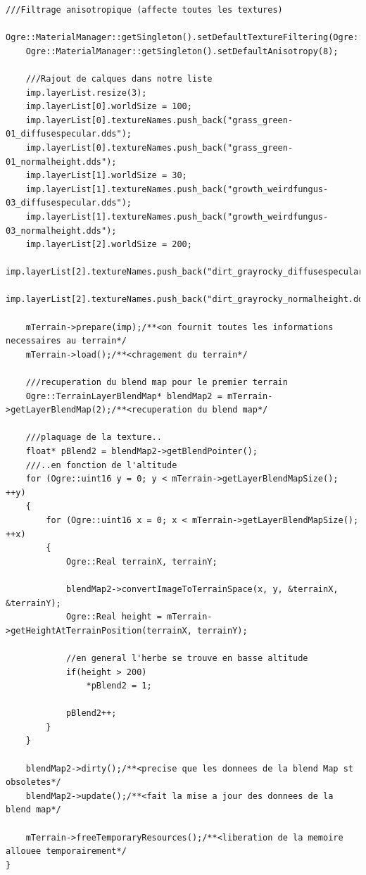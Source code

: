 \begin{lstlisting}[caption={createTerrain}]
    ///Filtrage anisotropique (affecte toutes les textures)
    Ogre::MaterialManager::getSingleton().setDefaultTextureFiltering(Ogre::TFO_ANISOTROPIC);
    Ogre::MaterialManager::getSingleton().setDefaultAnisotropy(8);
    
    ///Rajout de calques dans notre liste
    imp.layerList.resize(3);
    imp.layerList[0].worldSize = 100;
    imp.layerList[0].textureNames.push_back("grass_green-01_diffusespecular.dds");
    imp.layerList[0].textureNames.push_back("grass_green-01_normalheight.dds");
    imp.layerList[1].worldSize = 30;
    imp.layerList[1].textureNames.push_back("growth_weirdfungus-03_diffusespecular.dds");
    imp.layerList[1].textureNames.push_back("growth_weirdfungus-03_normalheight.dds");
    imp.layerList[2].worldSize = 200;
    imp.layerList[2].textureNames.push_back("dirt_grayrocky_diffusespecular.dds");
    imp.layerList[2].textureNames.push_back("dirt_grayrocky_normalheight.dds");
    
    mTerrain->prepare(imp);/**<on fournit toutes les informations necessaires au terrain*/
    mTerrain->load();/**<chragement du terrain*/    
    
    ///recuperation du blend map pour le premier terrain
    Ogre::TerrainLayerBlendMap* blendMap2 = mTerrain->getLayerBlendMap(2);/**<recuperation du blend map*/
    
    ///plaquage de la texture..
    float* pBlend2 = blendMap2->getBlendPointer();
    ///..en fonction de l'altitude
    for (Ogre::uint16 y = 0; y < mTerrain->getLayerBlendMapSize(); ++y)
    {
        for (Ogre::uint16 x = 0; x < mTerrain->getLayerBlendMapSize(); ++x)
        {
            Ogre::Real terrainX, terrainY;
            
            blendMap2->convertImageToTerrainSpace(x, y, &terrainX, &terrainY);
            Ogre::Real height = mTerrain->getHeightAtTerrainPosition(terrainX, terrainY);
            
            //en general l'herbe se trouve en basse altitude
            if(height > 200)
                *pBlend2 = 1;
            
            pBlend2++;
        }
    }
    
    blendMap2->dirty();/**<precise que les donnees de la blend Map st obsoletes*/
    blendMap2->update();/**<fait la mise a jour des donnees de la blend map*/ 
    
    mTerrain->freeTemporaryResources();/**<liberation de la memoire allouee temporairement*/
}

\end{lstlisting}




